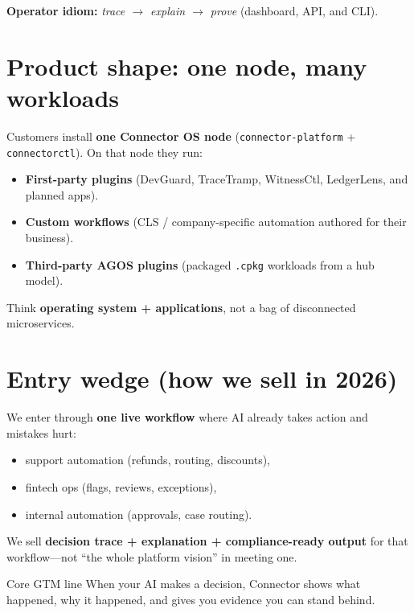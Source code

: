 \vspace{0.4em}
\noindent\textbf{Operator idiom:} \emph{trace $\rightarrow$ explain $\rightarrow$ prove} (dashboard, API, and CLI).

\section{Product shape: one node, many workloads}

Customers install \textbf{one Connector OS node} (\texttt{connector-platform} + \texttt{connectorctl}). On that node they run:

\begin{itemize}
  \item \textbf{First-party plugins} (DevGuard, TraceTramp, WitnessCtl, LedgerLens, and planned apps).
  \item \textbf{Custom workflows} (CLS / company-specific automation authored for their business).
  \item \textbf{Third-party AGOS plugins} (packaged \texttt{.cpkg} workloads from a hub model).
\end{itemize}

Think \textbf{operating system + applications}, not a bag of disconnected microservices.

\section{Entry wedge (how we sell in 2026)}

We enter through \textbf{one live workflow} where AI already takes action and mistakes hurt:

\begin{itemize}
  \item support automation (refunds, routing, discounts),
  \item fintech ops (flags, reviews, exceptions),
  \item internal automation (approvals, case routing).
\end{itemize}

We sell \textbf{decision trace + explanation + compliance-ready output} for that workflow---not ``the whole platform vision'' in meeting one.

\begin{conceptbox}{Core GTM line}
\centering
\large
When your AI makes a decision, Connector shows what happened, why it happened, and gives you evidence you can stand behind.
\end{conceptbox}


